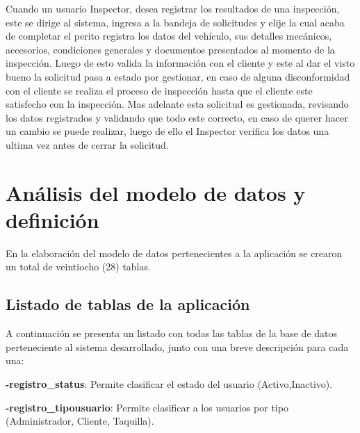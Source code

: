 

Cuando un usuario Inspector, desea registrar los resultados de una inspección, este se dirige al sistema, ingresa a la bandeja de solicitudes y elije la cual acaba de completar el perito registra los datos del vehículo, sus detalles mecánicos, accesorios, condiciones generales y documentos presentados al momento de la inspección. Luego de esto valida la información con el cliente y este al dar el visto bueno la solicitud pasa a estado por gestionar, en caso de alguna disconformidad con el cliente se realiza el proceso de inspección hasta que el cliente este satisfecho con la inspección. Mas adelante esta solicitud es gestionada, revisando los datos registrados y validando que todo este correcto, en caso de querer hacer un cambio se puede realizar, luego de ello el Inspector verifica los datos una ultima vez antes de cerrar la solicitud.
\setlength{\parskip}{0mm}


\section{Análisis del modelo de datos y definición} 
\setlength{\parskip}{5mm}

En la elaboración del modelo de datos pertenecientes a la aplicación se crearon un total de veintiocho (28) tablas.

\setlength{\parskip}{0mm}

\subsection{Listado de tablas de la aplicación}

\setlength{\parskip}{5mm}

A continuación se presenta un listado con todas las tablas de la base de datos perteneciente al sistema desarrollado, junto con una breve descripción para cada una:


\textbf{-registro\_status}: Permite clasificar el estado del usuario (Activo,Inactivo).

\textbf{-registro\_tipousuario}: Permite clasificar a los usuarios por tipo (Administrador, Cliente, Taquilla).

